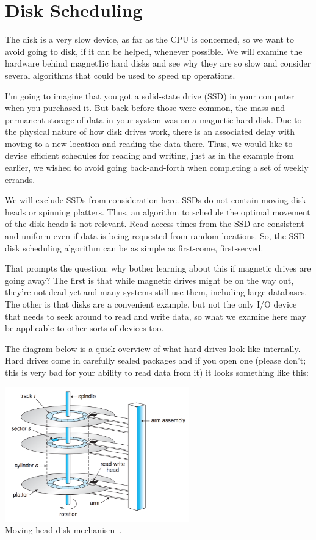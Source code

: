 




\section*{Disk Scheduling}
The disk is a very slow device, as far as the CPU is concerned, so we want to avoid going to disk, if it can be helped, whenever possible. We will examine the hardware behind magnet1ic hard disks and see why they are so slow and consider several algorithms that could be used to speed up operations.

I'm going to imagine that you got a solid-state drive (SSD) in your computer when you purchased it. But back before those were common, the mass and permanent storage of data in your system was on a magnetic hard disk. Due to the physical nature of how disk drives work, there is an associated delay with moving to a new location and reading the data there. Thus, we would like to devise efficient schedules for reading and writing, just as in the example from earlier, we wished to avoid going back-and-forth when completing a set of weekly errands.

We will exclude SSDs from consideration here. SSDs do not contain moving disk heads or spinning platters. Thus, an algorithm to schedule the optimal movement of the disk heads is not relevant. Read access times from the SSD are consistent and uniform even if data is being requested from random locations. So, the SSD disk scheduling algorithm can be as simple as first-come, first-served.

That prompts the question: why bother learning about this if magnetic drives are going away? The first is that while magnetic drives might be on the way out, they're not dead yet and many systems still use them, including large databases. The other is that disks are a convenient example, but not the only I/O device that needs to seek around to read and write data, so what we examine here may be applicable to other sorts of devices too.

The diagram below is a quick overview of what hard drives look like internally. Hard drives come in carefully sealed packages and if you open one (please don't; this is very bad for your ability to read data from it) it looks something like this:

\begin{center}
	\includegraphics[width=0.6\textwidth]{images/disk-hardware.png}\\
	Moving-head disk mechanism~\cite{osc}.
\end{center}

